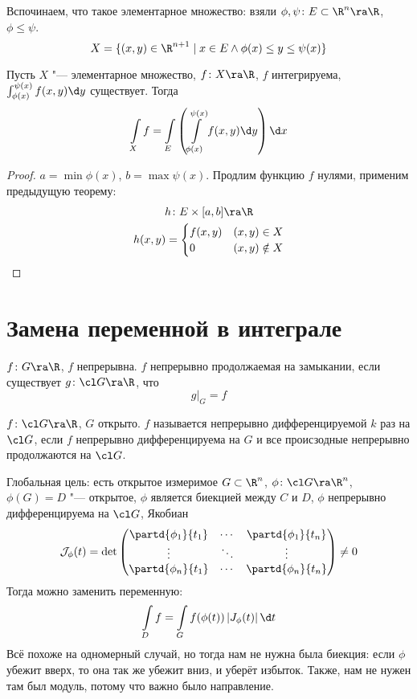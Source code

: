 \begin{Rem}
	Вспочинаем, что такое элементарное множество: взяли $\phi, \psi\colon E \subset \R^n \ra \R$, $\phi \le \psi$.
	\[ X = \{ (x, y) \in \R^{n+1} \mid x \in E \land \phi(x) \le y \le \psi(x)\} \]
\end{Rem}
\begin{theorem}
	Пусть $X$ "--- элементарное множество, $f\colon X \ra \R$, $f$ интегрируема, $\int_{\phi(x)}^{\psi(x)} f(x, y) \d y$ существует.
	Тогда
	\[ \int\limits_X f = \int\limits_E \left( \int\limits_{\phi(x)}^{\psi(x)} f(x, y) \d y \right) \d x \]
\end{theorem}
\begin{proof}
	$a = \min \phi(x)$, $b = \max \psi(x)$.
	Продлим функцию $f$ нулями, применим предыдущую теорему:
	\begin{gather*}
		h\colon E \times [a, b] \ra \R \\
		h(x, y) = \begin{cases} f(x, y) & (x, y) \in X \\ 0 & (x, y) \notin X \end{cases}
	\end{gather*}
\end{proof}

\section{Замена переменной в интеграле}

\begin{Def}
	$f\colon G \ra \R$, $f$ непрерывна.
	$f$ непрерывно продолжаемая на замыкании, если существует $g\colon \cl G \ra \R$, что
	\[ g \biggr|_G = f \]
\end{Def}

\begin{Def}
	$f\colon \cl G \ra \R$, $G$ открыто.
	$f$ называется непрерывно дифференцируемой $k$ раз на $\cl G$,
	если $f$ непрерывно дифференцируема на $G$ и все происзодные непрерывно продолжаются на $\cl G$.
\end{Def}

Глобальная цель: есть открытое измеримое $G \subset \R^n$, $\phi\colon \cl G \ra \R^n$,
$\phi(G) = D$ "--- открытое, $\phi$ является биекцией между $C$ и $D$, $\phi$ непрерывно дифференцируема на $\cl G$,
Якобиан
\[	\mathcal J_\phi(t) = \det \begin{pmatrix}
		\partd{\phi_1}{t_1} & \cdots & \partd{\phi_1}{t_n} \\
		\vdots & \ddots & \vdots \\
		\partd{\phi_n}{t_1} & \cdots & \partd{\phi_n}{t_n}
	\end{pmatrix} \ne 0
\]
Тогда можно заменить переменную:
\[
	\int\limits_D f = \int\limits_G f(\phi(t)) \left| J_\phi(t) \right| \d t
\]
Всё похоже на одномерный случай, но тогда нам не нужна была биекция: если $\phi$ убежит вверх, то она так же убежит вниз, и уберёт избыток.
Также, нам не нужен там был модуль, потому что важно было направление.
